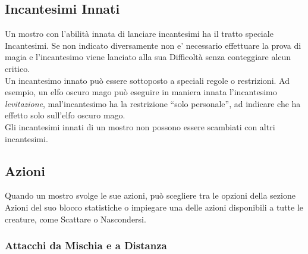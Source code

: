 \begin{multicols}{2}
\subsection{Incantesimi Innati}

Un mostro con l'abilità innata di lanciare incantesimi ha il tratto speciale Incantesimi.
Se non indicato diversamente non e' necessario effettuare la prova di magia e l'incantesimo viene lanciato alla sua Difficoltà senza conteggiare alcun critico.\\
Un incantesimo innato può essere sottoposto a speciali regole o restrizioni. Ad esempio, un elfo oscuro mago può eseguire in maniera innata l'incantesimo \emph{levitazione}, mal'incantesimo ha la  restrizione ``solo personale'', ad indicare che ha effetto solo
sull'elfo oscuro mago. \\
Gli incantesimi innati di un mostro non possono essere scambiati con altri incantesimi. 

\subsection{Azioni}

Quando un mostro svolge le sue azioni, può scegliere tra le opzioni della sezione Azioni del suo blocco statistiche o impiegare una delle azioni disponibili a tutte le creature, come Scattare o Nascondersi.

\subsubsection{Attacchi da Mischia e a Distanza}


\end{multicols}

